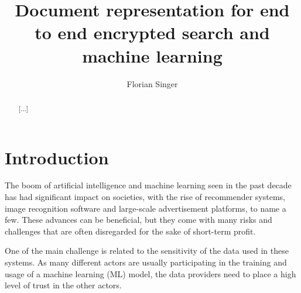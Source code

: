 \documentclass[a4paper,11pt,oneside]{report}
\title{Document representation for end to end encrypted search and machine learning}
\author{Florian Singer}
\begin{document}
\maketitle

\begin{abstract}
[...]
\end{abstract}

\maketoc


\chapter{Introduction}



The boom of artificial intelligence and machine learning seen in the past decade has had significant impact on societies, with the rise of recommender systems, image recognition software and large-scale advertisement platforms, to name a few. These advances can be beneficial, but they come with many risks and challenges that are often disregarded for the sake of short-term profit.

One of the main challenge is related to the sensitivity of the data used in these systems. As many different actors are usually participating in the training and usage of a machine learning (ML) model, the data providers need to place a high level of trust in the other actors.
\end{document}
